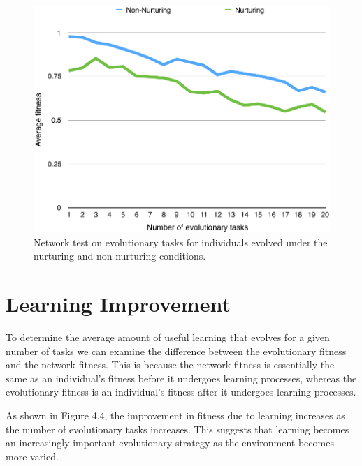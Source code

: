 \documentclass[master]{outhesis}
\begin{document}
\begin{figure}[H]
	\centering
	\includegraphics{NetworkTestPlot.pdf}
	\caption{Network test on evolutionary tasks for individuals evolved under the nurturing and non-nurturing conditions.}
\end{figure}

\section{Learning Improvement}

To determine the average amount of useful learning that evolves for a given number of tasks we can examine the difference between the evolutionary fitness and the network fitness.
This is because the network fitness is essentially the same as an individual's fitness before it undergoes learning processes, whereas the evolutionary fitness is an individual's fitness after it undergoes learning processes.

As shown in Figure 4.4, the improvement in fitness due to learning increases as the number of evolutionary tasks increases. This suggests that learning becomes an increasingly important evolutionary strategy as the environment becomes more varied.
\end{document}

